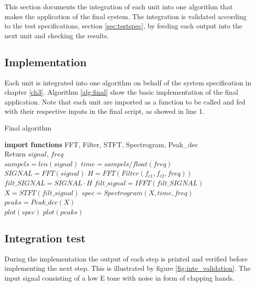 This section documents the integration of each unit into one algorithm that makes the application of the final system. The integration is validated according to the test specifications, section \ref{sec:testspec}, by feeding each output into the next unit and checking the results. 

\subsection{Implementation}
Each unit is integrated into one algorithm on behalf of the system specification in chapter \ref{ch3}. Algorithm \ref{alg:final} show the basic implementation of the final application. Note that each unit are imported as a function to be called and fed with their respective inputs in the final script, as showed in line 1.
\begin{algorithm}[H]
\caption{Final algorithm}
\begin{algorithmic}[1]
\State \textbf{import functions} FFT, Filter, STFT, Spectrogram, Peak\_dec  
\\
\State Return $signal$, $freq$ 
\EndProcedure 
\\
\State $sampels = len(signal)$ 
\State $time   = sampels/float(freq)$
\\
\State $SIGNAL = FFT(signal) $
\State $H = FFT(Filter(f_{c1},f_{c2},freq))$
\State $filt\_SIGNAL = SIGNAL \cdot H$
\State $filt\_signal = IFFT(filt\_SIGNAL)$  
\EndProcedure 
\\
\State $X = STFT(filt\_signal)$
\State $spec = Spectrogram(X,time,freq)$
\State $peaks = Peak\_dec(X)$
\EndProcedure
\\
\State $plot(spec)$ 
\State $plot(peaks)$
\EndProcedure
\end{algorithmic}
\label{alg:final}
\end{algorithm}      

\subsection{Integration test}
During the implementation the output of each step is printed and verified before implementing the next step. This is illustrated by figure \ref{fig:inte_validation}. The input signal consisting of a low E tone with noise in form of clapping hands.  

